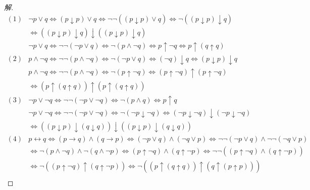 \documentclass{article}
\begin{document}
\begin{CJK*}{UTF8}{gbsn}
  \begin{proof}[解]
    \begin{align*}
      (1)&\lnot p\lor q\Leftrightarrow(p\downarrow p)\lor q
      \Leftrightarrow\lnot \lnot ((p\downarrow p)\lor q)
      \Leftrightarrow\lnot ((p\downarrow p)\downarrow q)\\
      &\Leftrightarrow ((p\downarrow p)\downarrow q)\downarrow ((p\downarrow p)\downarrow q)\\
      &\lnot p\lor q
      \Leftrightarrow\lnot\lnot (\lnot p \lor q)
      \Leftrightarrow\lnot (p \land \lnot q)
      \Leftrightarrow p\uparrow \lnot q
      \Leftrightarrow p\uparrow(q\uparrow q)\\ 
      (2)&p\land \lnot q
      \Leftrightarrow\lnot\lnot (p\land \lnot q)
      \Leftrightarrow\lnot (\lnot p \lor q)
      \Leftrightarrow(\lnot q)\downarrow q
      \Leftrightarrow(p\downarrow p)\downarrow q\\
      &p\land \lnot q
      \Leftrightarrow  \lnot \lnot (p\land \lnot q)
      \Leftrightarrow  \lnot (p\uparrow \lnot q)
      \Leftrightarrow(p\uparrow \lnot q)\uparrow (p\uparrow \lnot q)\\
      &\Leftrightarrow(p\uparrow (q\uparrow q))\uparrow (p\uparrow (q\uparrow q))\\
      (3)&\lnot p \lor \lnot q
      \Leftrightarrow \lnot\lnot (\lnot p \lor \lnot q)
      \Leftrightarrow \lnot (p \land q)
      \Leftrightarrow p\uparrow q\\
      &\lnot p \lor \lnot q
      \Leftrightarrow \lnot\lnot (\lnot p \lor \lnot q)
      \Leftrightarrow \lnot (\lnot p\downarrow \lnot q)
      \Leftrightarrow (\lnot p\downarrow \lnot q)\downarrow(\lnot p\downarrow \lnot q)\\
      &\Leftrightarrow (( p\downarrow p)\downarrow ( q\downarrow q))\downarrow(( p\downarrow p)\downarrow ( q\downarrow q))\\
      (4)&p\leftrightarrow q\Leftrightarrow (p\to q)\land (q\to p)\Leftrightarrow (\lnot p \lor q) \land (\lnot q\lor p) \Leftrightarrow \lnot \lnot (\lnot p \lor q) \land \lnot\lnot(\lnot q\lor p)\\
      &\Leftrightarrow\lnot (p\land \lnot q)\land \lnot (q\land \lnot p)\Leftrightarrow (p\uparrow \lnot q)\land (q\uparrow \lnot p)\Leftrightarrow \lnot\lnot ((p\uparrow \lnot q)\land (q\uparrow \lnot p))\\
      &\Leftrightarrow  \lnot((p\uparrow \lnot q)\uparrow (q\uparrow \lnot p))\Leftrightarrow\lnot((p\uparrow  (q\uparrow q))\uparrow (q\uparrow (p\uparrow p)))\\

\end{align*}
\end{proof}
\end{CJK*}
\end{document}
